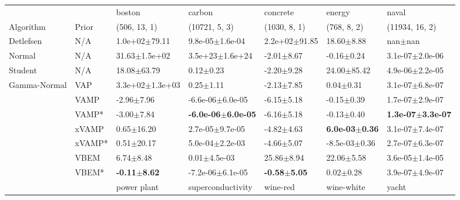 \begin{tabular}{lllllll}
\toprule
             &       &                   boston &                         carbon &                 concrete &                     energy &                         naval \\
Algorithm & Prior& (506, 13, 1)& (10721, 5, 3)& (1030, 8, 1)& (768, 8, 2)& (11934, 16, 2)\\
\midrule
Detlefsen & N/A &        1.0e+02$\pm$79.11 &            9.8e-05$\pm$1.6e-04 &        2.2e+02$\pm$91.85 &             18.60$\pm$8.88 &                   nan$\pm$nan \\
Normal & N/A &        31.63$\pm$1.5e+02 &            3.5e+23$\pm$1.6e+24 &           -2.01$\pm$8.67 &             -0.16$\pm$0.24 &           3.1e-07$\pm$2.0e-06 \\
Student & N/A &          18.08$\pm$63.79 &                  0.12$\pm$0.23 &           -2.20$\pm$9.28 &            24.00$\pm$85.42 &           4.9e-06$\pm$2.2e-05 \\
Gamma-Normal & VAP &      3.3e+02$\pm$1.3e+03 &                  0.25$\pm$1.11 &           -2.13$\pm$7.85 &              0.04$\pm$0.31 &           3.1e-07$\pm$6.8e-07 \\
             & VAMP &           -2.96$\pm$7.96 &           -6.6e-06$\pm$6.0e-05 &           -6.15$\pm$5.18 &             -0.15$\pm$0.39 &           1.7e-07$\pm$2.9e-07 \\
             & VAMP* &           -3.00$\pm$7.84 &  \textbf{-6.0e-06$\pm$6.0e-05} &           -6.16$\pm$5.18 &             -0.13$\pm$0.40 &  \textbf{1.3e-07$\pm$3.3e-07} \\
             & xVAMP &           0.65$\pm$16.20 &            2.7e-05$\pm$9.7e-05 &           -4.82$\pm$4.63 &  \textbf{6.0e-03$\pm$0.36} &           3.1e-07$\pm$7.4e-07 \\
             & xVAMP* &           0.51$\pm$20.17 &            5.0e-04$\pm$2.2e-03 &           -4.66$\pm$5.07 &          -8.5e-03$\pm$0.36 &           2.7e-07$\pm$6.3e-07 \\
             & VBEM &            6.74$\pm$8.48 &               0.01$\pm$4.5e-03 &           25.86$\pm$8.94 &             22.06$\pm$5.58 &           3.6e-05$\pm$1.4e-05 \\
             & VBEM* &  \textbf{-0.11$\pm$8.62} &           -7.2e-06$\pm$6.1e-05 &  \textbf{-0.58$\pm$5.05} &              0.02$\pm$0.28 &           3.9e-07$\pm$4.9e-07 \\
\midrule
             &       &             power plant &        superconductivity &                   wine-red &                  wine-white &                     yacht \\

\end{tabular}
